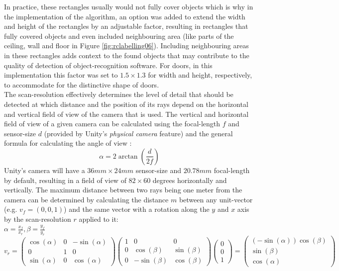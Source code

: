 In practice, these rectangles usually would not fully cover objects which is why in the implementation of the algorithm, an option was added to extend the width and height of the rectangles by an adjustable factor, resulting in rectangles that fully covered objects and even included neighbouring area (like parts of the ceiling, wall and floor in Figure \ref{fig:rclabelling06}). Including neighbouring areas in these rectangles adds context to the found objects that may contribute to the quality of detection of object-recognition software. For doors, in this implementation this factor was set to $1.5 \times 1.3$ for width and height, respectively, to accommodate for the distinctive shape of doors.\\
The scan-resolution effectively determines the level of detail that should be detected at which distance and the position of its rays depend on the horizontal and vertical field of view of the camera that is used. The vertical and horizontal field of view of a given camera can be calculated using the focal-length $f$ and sensor-size $d$ (provided by Unity's \textit{physical camera} feature) and the general formula for calculating the angle of view \cite{WikipediaAngleOfView}:
\[\alpha = 2 \arctan(\frac{d}{2f})\]
Unity's camera will have a $36mm \times 24mm$ sensor-size and $20.78mm$ focal-length by default, resulting in a field of view of $82 \times 60$ degrees horizontally and vertically. The maximum distance between two rays being one meter from the camera can be determined by calculating the distance $m$ between any unit-vector (e.g. $v_f = (0, 0, 1)$) and the same vector with a rotation along the $y$ and $x$ axis by the scan-resolution $r$ applied to it:\\
$\alpha = \frac{x_f}{x_r}, \beta = \frac{y_f}{y_r}$\\
$v_r = \begin{pmatrix}\cos(\alpha) & 0 & -\sin(\alpha) \\ 0 & 1 & 0 \\ \sin(\alpha) & 0 & \cos(\alpha)\end{pmatrix}
\begin{pmatrix}1 & 0 & 0 \\ 0 & \cos(\beta) & \sin(\beta) \\ 0 & -\sin(\beta) & \cos(\beta)\end{pmatrix} \begin{pmatrix}0 \\ 0 \\ 1\end{pmatrix} = \begin{pmatrix}(-\sin(\alpha)) \cos(\beta) \\ \sin(\beta) \\ \cos(\alpha)\end{pmatrix}$\\
